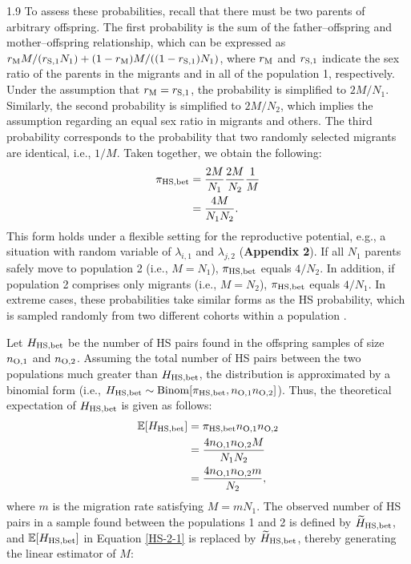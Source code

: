 \documentclass[12pt, English]{article}
\begin{document}
\begin{spacing}{1.9}
To assess these probabilities, recall that there must be two parents of arbitrary offspring. The first probability is the sum of the father--offspring and mother--offspring relationship, which can be expressed as $r_{\rm M}M/(r_{\rm S,1}N_{1}) + (1 - r_{\rm M})M/((1-r_{\rm S,1})N_{1})$, where $r_{\rm M}$ and $r_{\rm S,1}$ indicate the sex ratio of the parents in the migrants and in all of the population 1, respectively. Under the assumption that $r_{\rm M} = r_{\rm S,1}$, the probability is simplified to $2M/N_{1}$. Similarly, the second probability is simplified to $2M/N_{2}$, which implies the assumption regarding an equal sex ratio in migrants and others. The third probability corresponds to the probability that two randomly selected migrants are identical, i.e., $1/M$. Taken together, we obtain the following: 
\begin{align}
\pi_{\rm HS,bet} &= \frac{2M}{N_{1}} \frac{2M}{N_{2}} \frac{1}{M} \nonumber\\
&= \frac{4M}{N_{1}N_{2}}.
\label{HS-1}
\end{align}
This form holds under a flexible setting for the reproductive potential, e.g., a situation with random variable of $\lambda_{i,1}$ and $\lambda_{j,2}$ ({\bf Appendix 2}). If all $N_1$ parents safely move to population 2 (i.e., $M = N_1$), $\pi_{\rm HS,bet}$ equals $4/N_2$. In addition, if population 2 comprises only migrants (i.e., $M = N_2$), $\pi_{\rm HS,bet}$ equals $4/N_1$. In extreme cases, these probabilities take similar forms as the HS probability, which is sampled randomly from two different cohorts within a population \cite[]{bravington2016close}. 

Let $H_{\rm HS,bet}$ be the number of HS pairs found in the offspring samples of size $n_{\rm O, 1}$ and $n_{\rm O, 2}$. Assuming the total number of HS pairs between the two populations much greater than $H_{\rm HS,bet}$, the distribution is approximated by a binomial form (i.e., $H_{\rm HS,bet} \sim {\rm Binom}[\pi_{\rm HS,bet}, n_{\rm O, 1} n_{\rm O, 2}]$). Thus, the theoretical expectation of $H_{\rm HS,bet}$ is given as follows: 
\begin{align}
\mathbb{E}[H_{\rm HS, bet}] &= \pi_{\rm HS,bet} n_{\rm O, 1} n_{\rm O, 2} \nonumber\\
&= \frac{ 4 n_{\rm O, 1} n_{\rm O, 2} M } { N_{1} N_{2} } \label{HS-2-1}\\
&= \frac{ 4 n_{\rm O, 1} n_{\rm O, 2} m } { N_{2} },
\label{HS-2-2}
\end{align}
where $m$ is the migration rate satisfying $M = mN_{1}$. The observed number of HS pairs in a sample found between the populations 1 and 2 is defined by $\widetilde{H}_{\rm HS, bet}$, and $\mathbb{E}[H_{\rm HS, bet}]$ in Equation \ref{HS-2-1} is replaced by $\widetilde{H}_{\rm HS, bet}$, thereby generating the linear estimator of $M$:


\end{spacing}
\end{document}
